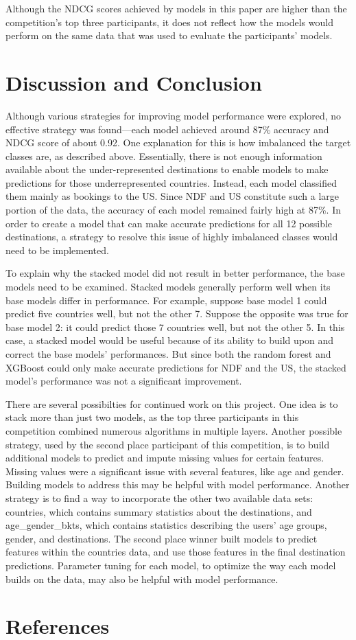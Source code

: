 \documentclass{article}
\begin{document}
Although the NDCG scores achieved by models in this paper are higher than the competition's top three participants, it does not reflect how the models would perform on the same data that was used to evaluate the participants’ models.

\section{Discussion and Conclusion}

Although various strategies for improving model performance were explored, no effective strategy was found---each model achieved around 87\% accuracy and NDCG score of about 0.92. One explanation for this is how imbalanced the target classes are, as described above. Essentially, there is not enough information available about the under-represented destinations to enable models to make predictions for those underrepresented countries. Instead, each model classified them mainly as bookings 
to the US. Since NDF and US constitute such a large portion of the data, the accuracy of each model 
remained fairly high at 87\%. In order to create a model that can make accurate predictions for all 12 possible 
destinations, a strategy to resolve this issue of highly imbalanced classes would need to be implemented.

To explain why the stacked model did not result in better performance, the base models need to be examined. 
Stacked models generally perform well when its base models differ in performance. For example, suppose base model 1
could predict five countries well, but not the other 7. Suppose the opposite was true for base model 2: it could predict those 7 countries well, but not the other 5. In this case, a stacked model would be useful because of its ability to build upon and 
correct the base models' performances. But since both the random forest and XGBoost could only make accurate predictions 
for NDF and the US, the stacked model's performance was not a significant improvement. 

There are several possibilties for continued work on this project. One idea is to stack more than just two models, as the top three participants in this competition combined numerous algorithms in multiple layers. Another possible strategy, used by the second place participant of this competition, is to build additional models to predict and impute missing values for certain features. Missing values were a significant issue with several features, like age and gender. Building models to address this may be helpful with model performance. Another strategy is to find a way to incorporate the other two available data sets: countries, which contains summary statistics about the destinations, and age\_gender\_bkts, which contains statistics describing the users' age groups, gender, and destinations. The second place winner built models to predict features within the countries data, and use those features in the final destination predictions. Parameter tuning for each model, to optimize the way each model builds on the data, may also be helpful with model performance.  




\section{References}
\end{document}
